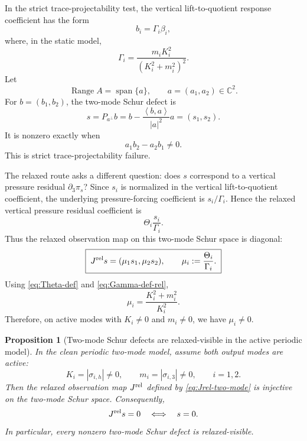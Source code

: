 \documentclass[11pt]{article}
\numberwithin{equation}{section}
\newtheorem{proposition}[theorem]{Proposition}
\DeclareMathOperator{\Range}{Range}
\newcommand{\ip}[2]{\left\langle #1,#2\right\rangle}
\begin{document}
In the strict trace-projectability test, the vertical lift-to-quotient response coefficient has the form
\[
        b_i=\Gamma_i\beta_i,
\]
where, in the static model,
\begin{equation}\label{eq:Gamma-def-rel}
        \Gamma_i=\frac{m_iK_i^2}{(K_i^2+m_i^2)^2}.
\end{equation}
Let
\[
        \Range A=\operatorname{span}\{a\},
        \qquad
        a=(a_1,a_2)\in\mathbb C^2.
\]
For \(b=(b_1,b_2)\), the two-mode Schur defect is
\begin{equation}\label{eq:s-two-mode-rel}
        s=P_{a^\perp}b
        =b-\frac{\ip{b}{a}}{|a|^2}a
        =(s_1,s_2).
\end{equation}
It is nonzero exactly when
\begin{equation}\label{eq:det-Schur-rel}
        a_1b_2-a_2b_1\ne0.
\end{equation}
This is strict trace-projectability failure.

The relaxed route asks a different question: does \(s\) correspond to a vertical pressure residual \(\partial_3\pi_s\)?  Since \(s_i\) is normalized in the vertical lift-to-quotient coefficient, the underlying pressure-forcing coefficient is \(s_i/\Gamma_i\).  Hence the relaxed vertical pressure residual coefficient is
\[
        \Theta_i\frac{s_i}{\Gamma_i}.
\]
Thus the relaxed observation map on this two-mode Schur space is diagonal:
\begin{equation}\label{eq:Jrel-two-mode}
        \boxed{\;
        J^{\rm rel}s=(\mu_1s_1,\mu_2s_2),
        \qquad
        \mu_i:=\frac{\Theta_i}{\Gamma_i}.
        \;}
\end{equation}
Using \eqref{eq:Theta-def} and \eqref{eq:Gamma-def-rel},
\begin{equation}\label{eq:mu-i}
        \boxed{\;
        \mu_i=\frac{K_i^2+m_i^2}{K_i^2}.
        \;}
\end{equation}
Therefore, on active modes with \(K_i\ne0\) and \(m_i\ne0\), we have \(\mu_i\ne0\).

\begin{proposition}[Two-mode Schur defects are relaxed-visible in the active periodic model]\label{prop:two-mode-relaxed-visible}
In the clean periodic two-mode model, assume both output modes are active:
\[
        K_i=|\sigma_{i,h}|\ne0,
        \qquad
        m_i=|\sigma_{i,3}|\ne0,
        \qquad i=1,2.
\]
Then the relaxed observation map \(J^{\rm rel}\) defined by \eqref{eq:Jrel-two-mode} is injective on the two-mode Schur space.  Consequently,
\begin{equation}\label{eq:Jrel-injective}
        J^{\rm rel}s=0
        \quad\Longleftrightarrow\quad
        s=0.
\end{equation}
In particular, every nonzero two-mode Schur defect is relaxed-visible.
\end{proposition}
\end{document}
